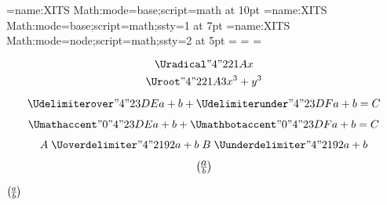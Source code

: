 

\font\4={name:XITS Math:mode=base;script=math} at 10pt
\font\5={name:XITS Math:mode=base;script=math;ssty=1} at 7pt
\font\6={name:XITS Math:mode=node;script=math;ssty=2} at 5pt
=\4 =\5 =\6

$$\Uradical "4 "221A {x}$$
$$\Uroot    "4 "221A {3}{x^3+y^3}$$

$$
  \Udelimiterover  "4 "23DE {a+b}
+ \Udelimiterunder "4 "23DF {a+b} = C
$$

$$
  \Umathaccent    "0 "4 "23DE {a+b}
+ \Umathbotaccent "0 "4 "23DF {a+b} = C
$$

$$
A \mathrel{\Uoverdelimiter  "4 "2192 {a+b}}
B \mathrel{\Uunderdelimiter "4 "2192 {a+b}}
$$

$$
a \overwithdelims() b
$$


\centerline{$ a \overwithdelims() b $}

\bye

